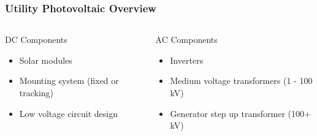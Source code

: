 \documentclass[aspectratio=169]{beamer}
\begin{document}
\begin{frame}
  \frametitle{Utility Photovoltaic Overview}
  \begin{columns}[t]
    \begin{block}{DC Components}
      \begin{itemize}
        \item Solar modules
        \item Mounting system (fixed or tracking)
        \item Low voltage circuit design
      \end{itemize}
      
    \end{block}
    \begin{block}{AC Components}
      \begin{itemize}
      \item Inverters
      \item Medium voltage transformers (1 - 100 kV)
      \item Generator step up transformer (100+ kV)
      \end{itemize}
    \end{block}
  \end{columns}
\end{frame}
  
\end{document}
